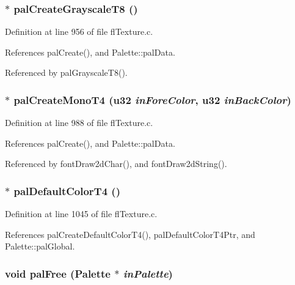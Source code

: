 \subsubsection{$\ast$ pal\-Create\-Grayscale\-T8 ()}\label{flTexture_8c_8ffa2ade3f63babe659c20011e7249e8}




Definition at line 956 of file fl\-Texture.c.

References pal\-Create(), and Palette::pal\-Data.

Referenced by pal\-Grayscale\-T8().
\subsubsection{$\ast$ pal\-Create\-Mono\-T4 (u32 {\em in\-Fore\-Color}, u32 {\em in\-Back\-Color})}\label{flTexture_8c_5eeec9707c8c18854c134ea6860946f4}




Definition at line 988 of file fl\-Texture.c.

References pal\-Create(), and Palette::pal\-Data.

Referenced by font\-Draw2d\-Char(), and font\-Draw2d\-String().
\subsubsection{$\ast$ pal\-Default\-Color\-T4 ()}\label{flTexture_8c_7a829d96ab4f8371f9696c22a913160e}




Definition at line 1045 of file fl\-Texture.c.

References pal\-Create\-Default\-Color\-T4(), pal\-Default\-Color\-T4Ptr, and Palette::pal\-Global.
\subsubsection{\setlength{\rightskip}{0pt plus 5cm}void pal\-Free ({\bf Palette} $\ast$ {\em in\-Palette})}\label{flTexture_8c_306915805350c2933a2ccfee61cfc7da}




